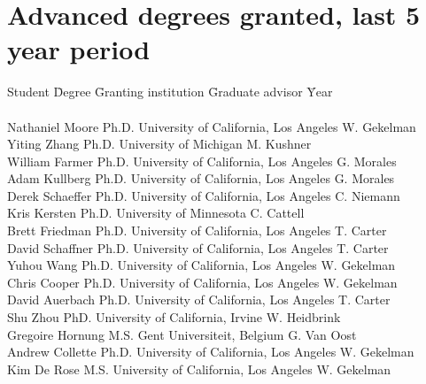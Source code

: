 \documentclass[11pt]{article}
\begin{document}
\section{Advanced degrees granted, last 5 year period}
 \begin{tabbing}
Student \hspace{0.7 in} \= Degree \hspace{0.1in} \= Granting institution \hspace{1.5in} \= Graduate advisor\hspace{0.3in} \= Year \\
\\
Nathaniel Moore  \> Ph.D. \>  University of California, Los Angeles \> W. Gekelman \\
Yiting Zhang \> Ph.D. \> University of Michigan \> M. Kushner \\
William Farmer	 \> Ph.D. \>  University of California, Los Angeles \> G. Morales \\
Adam Kullberg	 \> Ph.D. \>  University of California, Los Angeles \> G. Morales \\
Derek Schaeffer  \> Ph.D. \>  University of California, Los Angeles \> C. Niemann \\
Kris Kersten \> Ph.D. \> University of Minnesota \> C. Cattell \\
Brett Friedman \> Ph.D. \>  University of California, Los Angeles \> T. Carter \\
David Schaffner \> Ph.D. \>  University of California, Los Angeles \> T. Carter \\
Yuhou Wang  \> Ph.D. \>  University of California, Los Angeles \> W. Gekelman \\
Chris Cooper  \> Ph.D. \>  University of California, Los Angeles \> W. Gekelman \\
David Auerbach  \> Ph.D. \>  University of California, Los Angeles \> T. Carter \\
Shu Zhou \> PhD. \> University of California, Irvine \> W. Heidbrink
 \\
Gregoire Hornung \> M.S. \> Gent Universiteit, Belgium \> G. Van Oost
  \\
Andrew Collette \> Ph.D. \>  University of California, Los Angeles \> W. Gekelman \\
Kim De Rose\> M.S. \>  University of California, Los Angeles \> W. Gekelman \\

\end{tabbing}
\end{document}
